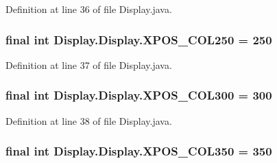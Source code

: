 Definition at line 36 of file Display.\+java.

\hypertarget{class_display_1_1_display_a9bc5732eb1a6077901a5e66984ffa339}{}
\subsubsection[{X\+P\+O\+S\+\_\+\+C\+O\+L250}]{\setlength{\rightskip}{0pt plus 5cm}final int Display.\+Display.\+X\+P\+O\+S\+\_\+\+C\+O\+L250 = 250\hspace{0.3cm}{\ttfamily [static]}}\label{class_display_1_1_display_a9bc5732eb1a6077901a5e66984ffa339}


Definition at line 37 of file Display.\+java.

\hypertarget{class_display_1_1_display_a37098506cf494cbf79cc2ca5e88cd3ac}{}
\subsubsection[{X\+P\+O\+S\+\_\+\+C\+O\+L300}]{\setlength{\rightskip}{0pt plus 5cm}final int Display.\+Display.\+X\+P\+O\+S\+\_\+\+C\+O\+L300 = 300\hspace{0.3cm}{\ttfamily [static]}}\label{class_display_1_1_display_a37098506cf494cbf79cc2ca5e88cd3ac}


Definition at line 38 of file Display.\+java.

\hypertarget{class_display_1_1_display_ac0e291caffea8a2d26755c36464c8418}{}
\subsubsection[{X\+P\+O\+S\+\_\+\+C\+O\+L350}]{\setlength{\rightskip}{0pt plus 5cm}final int Display.\+Display.\+X\+P\+O\+S\+\_\+\+C\+O\+L350 = 350\hspace{0.3cm}{\ttfamily [static]}}\label{class_display_1_1_display_ac0e291caffea8a2d26755c36464c8418}


